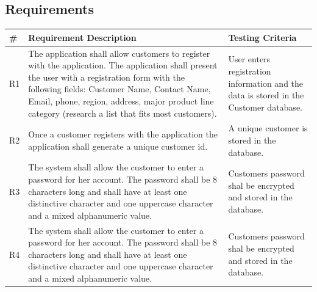 \documentclass[12pt]{article}
\begin{document}
\begin{myspace}{1.7}
%
%
\pagebreak
\section*{Requirements}  



%
%

\begin{tabular}{| p{1cm}|p{9cm} |p{5cm}|}
  \hline
  \# & Requirement Description & Testing Criteria \\
  \hline
  R1 &
  The application shall allow customers to register with the application.  The application shall present the user with a registration form with the following fields: Customer Name, Contact Name, Email, phone, region, address, major product line category (research a list that fits most customers). &
  User enters registration information and the data is stored in the Customer database. 
  \\
  \hline
  R2 & Once a customer registers with the application the application shall generate a unique customer id. &
  A unique customer is stored in the database.\\
  \hline
  R3 & The system shall allow the customer to enter a password for her account. The password shall be 8
  characters long and shall have at least one distinctive character and one uppercase character and a mixed alphanumeric value. & Customers password shal be encrypted and stored in the database.\\
  \hline
  R4 & The system shall allow the customer to enter a password for her account. The password shall be 8
  characters long and shall have at least one distinctive character and one uppercase character and a mixed alphanumeric value. & Customers password shal be encrypted and stored in the database.\\
  \hline
\end{tabular}
\pagebreak

\end{myspace}
\end{document}
